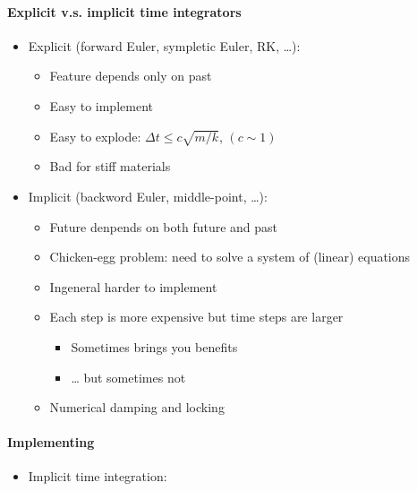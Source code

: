 \documentclass[11pt]{article}
\providecommand{\tightlist}{%
      \setlength{\itemsep}{0pt}\setlength{\parskip}{0pt}}
\begin{document}
    \hypertarget{explicit-v.s.-implicit-time-integrators}{%
\paragraph{Explicit v.s. implicit time
integrators}\label{explicit-v.s.-implicit-time-integrators}}

\begin{itemize}
\tightlist
\item
  Explicit (forward Euler, sympletic Euler, RK, \ldots):

  \begin{itemize}
  \tightlist
  \item
    Feature depends only on past
  \item
    Easy to implement
  \item
    Easy to explode: \(\Delta t \le c\sqrt{m/k}\), \((c\sim 1)\)
  \item
    Bad for stiff materials
  \end{itemize}
\item
  Implicit (backword Euler, middle-point, \ldots):

  \begin{itemize}
  \tightlist
  \item
    Future denpends on both future and past
  \item
    Chicken-egg problem: need to solve a system of (linear) equations
  \item
    Ingeneral harder to implement
  \item
    Each step is more expensive but time steps are larger

    \begin{itemize}
    \tightlist
    \item
      Sometimes brings you benefits
    \item
      \ldots{} but sometimes not
    \end{itemize}
  \item
    Numerical damping and locking
  \end{itemize}
\end{itemize}

\hypertarget{implementing}{%
\paragraph{Implementing}\label{implementing}}

\begin{itemize}
\tightlist
\item
  Implicit time integration:
\end{itemize}
\end{document}
